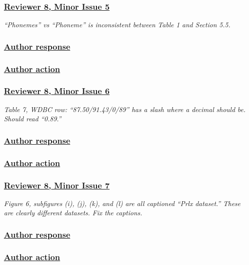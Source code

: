 \documentclass[journal,12pt, onecolumn]{IEEEtran}
\begin{document}
{\color{customgreen}
\subsubsection*{\underline{\textbf{Reviewer 8, Minor Issue 5}}}
\emph{``Phonemes'' vs ``Phoneme'' is inconsistent between Table 1 and Section 5.5.}
}


{\color{black}
\subsubsection*{\textbf{\underline{Author response}}}
}


{\color{black}
\subsubsection*{\textbf{\underline{Author action}}}
}


{\color{customgreen}
\subsubsection*{\underline{\textbf{Reviewer 8, Minor Issue 6}}}
\emph{Table 7, WDBC row: ``87.50/91.43/0/89'' has a slash where a decimal should be. Should read ``0.89.''}
}


{\color{black}
\subsubsection*{\textbf{\underline{Author response}}}
}


{\color{black}
\subsubsection*{\textbf{\underline{Author action}}}
}


{\color{customgreen}
\subsubsection*{\underline{\textbf{Reviewer 8, Minor Issue 7}}}
\emph{Figure 6, subfigures (i), (j), (k), and (l) are all captioned ``Prlx dataset.'' These are clearly different datasets. Fix the captions.}
}


{\color{black}
\subsubsection*{\textbf{\underline{Author response}}}
}


{\color{black}
\subsubsection*{\textbf{\underline{Author action}}}
}
\end{document}
